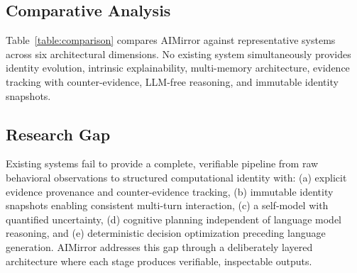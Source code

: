 \documentclass[conference]{IEEEtran}
\begin{document}
\subsection{Comparative Analysis}
Table~\ref{table:comparison} compares AIMirror against representative systems across six architectural dimensions. No existing system simultaneously provides identity evolution, intrinsic explainability, multi-memory architecture, evidence tracking with counter-evidence, LLM-free reasoning, and immutable identity snapshots.

\begin{table}[htbp]
\centering
\caption{Architectural comparison across representative systems and dimensions. Checkmark (\checkmark) indicates full support; ($\circ$) indicates partial support.}
\label{table:comparison}
\end{table}

\subsection{Research Gap}
Existing systems fail to provide a complete, verifiable pipeline from raw behavioral observations to structured computational identity with: (a) explicit evidence provenance and counter-evidence tracking, (b) immutable identity snapshots enabling consistent multi-turn interaction, (c) a self-model with quantified uncertainty, (d) cognitive planning independent of language model reasoning, and (e) deterministic decision optimization preceding language generation. AIMirror addresses this gap through a deliberately layered architecture where each stage produces verifiable, inspectable outputs.
\end{document}
